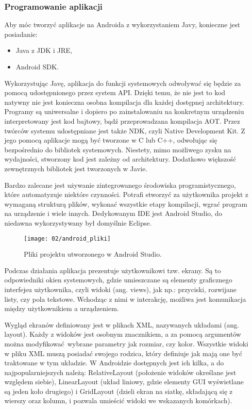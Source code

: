 \subsubsection*{Programowanie aplikacji}
Aby móc tworzyć aplikacje na Androida z wykorzystaniem Javy, konieczne jest posiadanie:

\begin{itemize}
	\item Java z JDK i JRE,
	\item Android SDK.
\end{itemize}

Wykorzystując Javę, aplikacja do funkcji systemowych odwoływać się będzie za pomocą udostępnionego przez system API. Dzięki temu, że nie jest to kod natywny nie jest konieczna osobna kompilacja dla każdej dostępnej architektury. Programy są uniwersalne i dopiero po zainstalowaniu na konkretnym urządzeniu interpretowany jest kod bajtowy, bądź przeprowadzana kompilacja AOT. Przez twórców systemu udostępniane jest także NDK, czyli Native Development Kit. Z jego pomocą aplikacje mogą być tworzone w C lub C++, odwołując się bezpośrednio do bibliotek systemowych. Niestety, mimo możliwego zysku na wydajności, stworzony kod jest zależny od architektury. Dodatkowo większość zewnętrznych bibliotek jest tworzonych w Javie. 

Bardzo zalecane jest używanie zintegrowanego środowiska programistycznego, które automatyzuje niektóre czynności. Potrafi stworzyć za użytkownika projekt z wymaganą strukturą plików, wykonać wszystkie etapy kompilacji, wgrać program na urządzenie i wiele innych. Dedykowanym IDE jest Android Studio, do niedawna wykorzystywany był domyślnie Eclipse.

\begin{figure}[h]
	\begin{center}
		\texttt{[image: 02/android\_pliki]}
	\end{center}
	\caption{Pliki projektu utworzonego w Android Studio.}
	\vspace{-0.3cm}
\end{figure}

Podczas działania aplikacja prezentuje użytkownikowi tzw. ekrany. Są to odpowiedniki okien systemowych, gdzie umieszczane są elementy graficznego interfejsu użytkownika, czyli widoki (ang. views), jak np.: przyciski, rozwijane listy, czy pola tekstowe. Wchodząc z nimi w interakcję, możliwa jest komunikacja między użytkownikiem a urządzeniem. 

Wygląd ekranów definiowany jest w plikach XML, nazywanych układami (ang. layout). Każdy z widoków jest osobnym znacznikiem, a za pomocą argumentów można modyfikować wybrane parametry jak rozmiar, czy kolor. Wszystkie widoki w pliku XML muszą posiadać swojego rodzica, który definiuje jak mają one być traktowane w tym układzie. W Androidzie dostępnych jest ich kilka, a do najpopularniejszych należą: RelativeLayout (położenie widoków określane jest względem siebie), LinearLayout (układ liniowy, gdzie elementy GUI wyświetlane są jeden koło drugiego) i GridLayout (dzieli ekran na siatkę, składającą się z wierszy oraz kolumn, i pozwala umieścić widoki we wskazanych komórkach).

